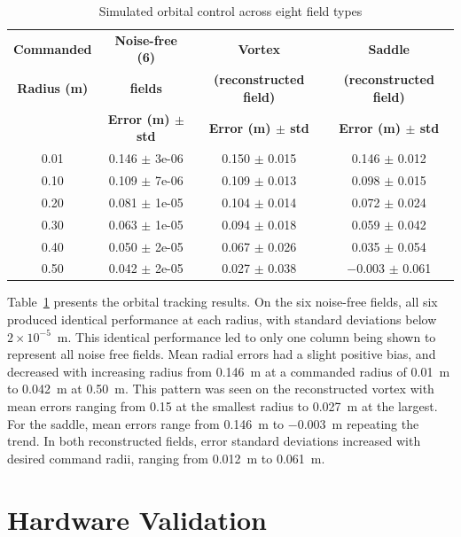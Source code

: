 \documentclass[lettersize,journal]{IEEEtran}
\begin{document}
\begin{table}[!t]
    \centering
    \caption{Simulated orbital control across eight field types}
    \label{tab:simulation_orbital_results}
    \footnotesize
    \setlength{\tabcolsep}{3pt}
    \begin{tabular}{cccc}
    \hline
    \textbf{Commanded} & \textbf{Noise-free (6)} & \textbf{Vortex} & \textbf{Saddle} \\
    \textbf{Radius (m)} & \textbf{fields} & \textbf{(reconstructed field)} & \textbf{(reconstructed field)} \\
     & \textbf{Error (m) $\pm$ std} & \textbf{Error (m) $\pm$ std} & \textbf{Error (m) $\pm$ std} \\
    \hline
    0.01 & 0.146 $\pm$ 3e-06 & 0.150 $\pm$ 0.015 & 0.146 $\pm$ 0.012 \\
    0.10 & 0.109 $\pm$ 7e-06 & 0.109 $\pm$ 0.013 & 0.098 $\pm$ 0.015 \\
    0.20 & 0.081 $\pm$ 1e-05 & 0.104 $\pm$ 0.014 & 0.072 $\pm$ 0.024 \\
    0.30 & 0.063 $\pm$ 1e-05 & 0.094 $\pm$ 0.018 & 0.059 $\pm$ 0.042 \\
    0.40 & 0.050 $\pm$ 2e-05 & 0.067 $\pm$ 0.026 & 0.035 $\pm$ 0.054 \\
    0.50 & 0.042 $\pm$ 2e-05 & 0.027 $\pm$ 0.038 & $-$0.003 $\pm$ 0.061 \\

    \hline
    \end{tabular}
    \end{table}


    Table~\ref{tab:simulation_orbital_results} presents the orbital tracking results. On the six noise-free fields, all six produced identical
    performance at each radius, with standard deviations below $2 \times 10^{-5}$~m. This identical performance led to only one column being shown to represent all noise free fields. Mean radial errors had a slight positive bias, and decreased with increasing radius from 0.146~m at a commanded radius of 0.01~m to 0.042~m at 0.50~m. This pattern was seen on the reconstructed vortex with mean errors ranging from 0.15 at the smallest radius to 0.027~m at the largest. For the saddle, mean errors range from 0.146~m to $-0.003$~m repeating the trend. In both reconstructed fields, error standard deviations increased with desired command radii, ranging from 0.012~m to 0.061~m.    


\section{Hardware Validation}
\end{document}
